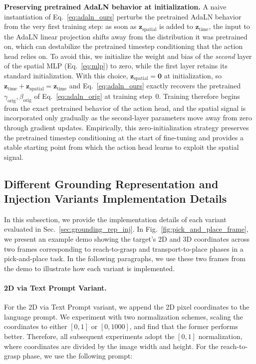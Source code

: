 \noindent\textbf{Preserving pretrained AdaLN behavior at initialization.}
A naive instantiation of Eq.~\ref{eq:adaln_ours} perturbs the pretrained AdaLN behavior from the very first training step: as soon as $\mathbf{z}_{\text{spatial}}$ is added to $\mathbf{z}_{\text{time}}$, the input to the AdaLN linear projection shifts away from the distribution it was pretrained on, which can destabilize the pretrained timestep conditioning that the action head relies on. To avoid this, we initialize the weight and bias of the \emph{second} layer of the spatial MLP (Eq.~\ref{eq:mlp}) to zero, while the first layer retains its standard initialization. With this choice, $\mathbf{z}_{\text{spatial}} = \mathbf{0}$ at initialization, so $\mathbf{z}_{\text{time}} + \mathbf{z}_{\text{spatial}} = \mathbf{z}_{\text{time}}$ and Eq.~\ref{eq:adaln_ours} exactly recovers the pretrained $\gamma_{\text{orig}}, \beta_{\text{orig}}$ of Eq.~\ref{eq:adaln_orig} at training step~0. Training therefore begins from the exact pretrained behavior of the action head, and the spatial signal is incorporated only gradually as the second-layer parameters move away from zero through gradient updates.  Empirically, this zero-initialization strategy preserves the pretrained timestep conditioning at the start of fine-tuning and provides a stable starting point from which the action head learns to exploit the spatial signal.

\subsection{Different Grounding Representation and Injection Variants Implementation Details}
\label{supp:sec:subsec:grounding_variants}

In this subsection, we provide the implementation details of each variant evaluated in Sec.~\ref{sec:grounding_rep_inj}. In Fig.~\ref{fig:pick_and_place_frame}, we present an example demo showing the target’s 2D and 3D coordinates across two frames corresponding to reach-to-grasp and transport-to-place phases in a pick-and-place task. In the following paragraphs, we use these two frames from the demo to illustrate how each variant is implemented.

\paragraph{2D via Text Prompt Variant.}
For the 2D via Text Prompt variant, we append the 2D pixel coordinates to the language prompt. We experiment with two normalization schemes, scaling the coordinates to either $[0, 1]$ or $[0, 1000]$, and find that the former performs better. Therefore, all subsequent experiments adopt the $[0, 1]$ normalization, where coordinates are divided by the image width and height. For the reach-to-grasp phase, we use the following prompt:

